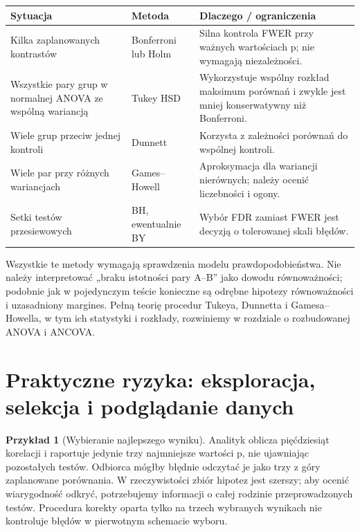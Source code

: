 \documentclass[11pt,a4paper,oneside]{report}
\numberwithin{equation}{chapter}
\theoremstyle{plain}
\theoremstyle{definition}
\newtheorem{przyklad}{Przykład}[chapter]
\theoremstyle{remark}
\begin{document}
\begin{center}\small
\begin{tabular}{>{\raggedright\arraybackslash}p{}>{\raggedright\arraybackslash}p{}>{\raggedright\arraybackslash}p{}}
\toprule
\textbf{Sytuacja} & \textbf{Metoda} & \textbf{Dlaczego / ograniczenia}\\
\midrule
Kilka zaplanowanych kontrastów & Bonferroni lub Holm & Silna kontrola FWER przy ważnych wartościach p; nie wymagają niezależności.\\
Wszystkie pary grup w normalnej ANOVA ze wspólną wariancją & Tukey HSD & Wykorzystuje wspólny rozkład maksimum porównań i zwykle jest mniej konserwatywny niż Bonferroni.\\
Wiele grup przeciw jednej kontroli & Dunnett & Korzysta z zależności porównań do wspólnej kontroli.\\
Wiele par przy różnych wariancjach & Games--Howell & Aproksymacja dla wariancji nierównych; należy ocenić liczebności i ogony.\\
Setki testów przesiewowych & BH, ewentualnie BY & Wybór FDR zamiast FWER jest decyzją o tolerowanej skali błędów.\\
\bottomrule
\end{tabular}
\end{center}

Wszystkie te metody wymagają sprawdzenia modelu
prawdopodobieństwa. Nie należy interpretować
„braku istotności pary A--B” jako dowodu równoważności;
podobnie jak w pojedynczym teście konieczne są
odrębne hipotezy równoważności i uzasadniony margines.
Pełną teorię procedur Tukeya, Dunnetta i Gamesa--Howella,
w tym ich statystyki i rozkłady, rozwiniemy w rozdziale
o rozbudowanej ANOVA i ANCOVA.

\section{Praktyczne ryzyka: eksploracja, selekcja i podglądanie danych}
\begin{przyklad}[Wybieranie najlepszego wyniku]
Analityk oblicza pięćdziesiąt korelacji i raportuje
jedynie trzy najmniejsze wartości p, nie ujawniając
pozostałych testów. Odbiorca mógłby błędnie odczytać je
jako trzy z góry zaplanowane porównania. W rzeczywistości
zbiór hipotez jest szerszy; aby ocenić wiarygodność
odkryć, potrzebujemy informacji o całej rodzinie
przeprowadzonych testów. Procedura korekty oparta tylko
na trzech wybranych wynikach nie kontroluje błędów
w pierwotnym schemacie wyboru.
\end{przyklad}
\end{document}
